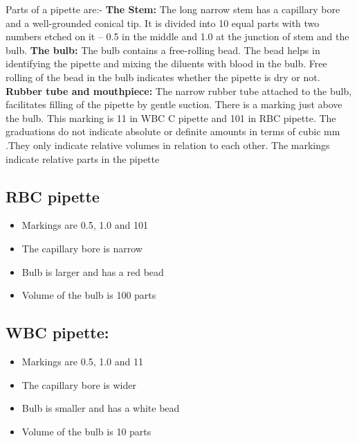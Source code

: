 \documentclass[a4paper,12pt,openany,oneside]{book}
\begin{document}
					Parts of a pipette are:-\newline
					\textbf{The Stem:}
					The long narrow stem has a capillary bore and a well-grounded conical tip. It is divided into 10 equal parts with two numbers etched on it – 0.5 in the middle and 1.0 at the junction of stem and the bulb.\newline
					\textbf{The bulb:}
					The bulb contains a free-rolling bead. The bead helps in identifying the pipette and mixing the diluents with blood in the bulb. Free rolling of the bead in the bulb indicates whether the pipette is dry or not.\newline
					\textbf{Rubber tube and mouthpiece:}
					The narrow rubber tube attached to the bulb, facilitates filling of the pipette by gentle suction. There is a marking just above the bulb. This marking is 11 in WBC C pipette and 101 in RBC pipette. The graduations do not indicate absolute or definite amounts in terms of cubic mm .They only indicate relative volumes in relation to each other. The markings indicate relative parts in the pipette\newline

					\subsection*{RBC pipette}
					\begin{itemize}

						\item{Markings are 0.5, 1.0 and 101}
						\item{The capillary bore is narrow}
						\item{Bulb is larger and has a red bead}
						\item{Volume of the bulb is 100 parts}
					\end{itemize}

					\subsection*{WBC pipette:}
					\begin{itemize}
						\item{Markings are 0.5, 1.0 and 11}
						\item{The capillary bore is wider}
						\item{Bulb is smaller and has a white bead}
						\item{Volume of the bulb is 10 parts}
					\end{itemize}
\end{document}

